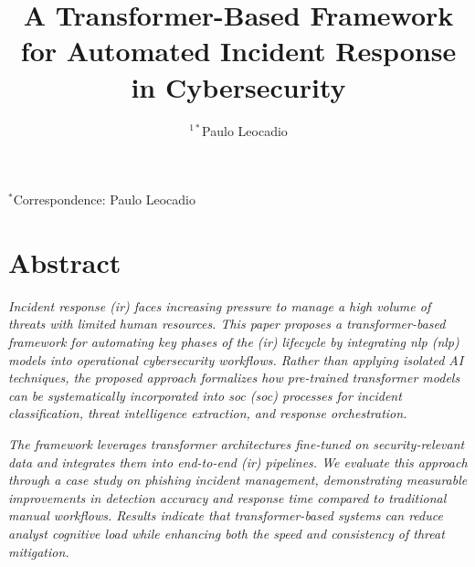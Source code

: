 \documentclass[12pt,oneside]{academia}
\theoremstyle{remark}
\begin{document}
\renewcommand{\qedsymbol}{}
%
%
%
%
\proofstage{}
\jName{}
\title{A Transformer-Based Framework for Automated Incident Response in Cybersecurity}
\author{$^{1*}$Paulo Leocadio}
\maketitle
{}
\noindent $^{*}$Correspondence: Paulo Leocadio
 \ 
\\
\section*{Abstract}
\noindent \textit{Incident response (\acrshort{ir}) faces increasing pressure to manage a high volume of threats with limited human resources. This paper proposes a transformer-based framework for automating key phases of the (\acrshort{ir}) lifecycle by integrating \acrlong{nlp} (\acrshort{nlp}) models into operational cybersecurity workflows. Rather than applying isolated AI techniques, the proposed approach formalizes how pre-trained transformer models can be systematically incorporated into \acrlong{soc} (\acrshort{soc}) processes for incident classification, threat intelligence extraction, and response orchestration.}

\textit{The framework leverages transformer architectures fine-tuned on security-relevant data and integrates them into end-to-end (\acrshort{ir}) pipelines. We evaluate this approach through a case study on phishing incident management, demonstrating measurable improvements in detection accuracy and response time compared to traditional manual workflows. Results indicate that transformer-based systems can reduce analyst cognitive load while enhancing both the speed and consistency of threat mitigation.}
\end{document}
